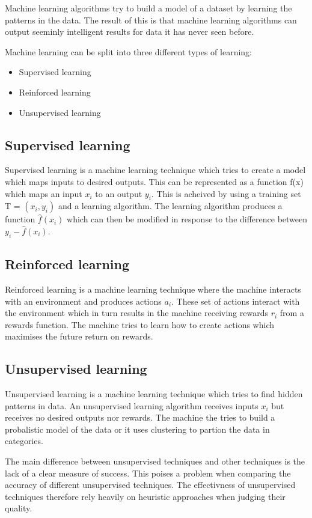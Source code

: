 Machine learning algorithms try to build a model of a dataset by learning the patterns in the data.
The result of this is that machine learning algorithms can output seeminly intelligent results for data it has never seen before.

Machine learning can be split into three different types of learning:
\begin{itemize}
    \item Supervised learning
    \item Reinforced learning
    \item Unsupervised learning
\end{itemize}

\subsection{Supervised learning}
Supervised learning is a machine learning technique which tries to create a model which maps inputs to desired outputs.
This can be represented as a function f(x) which maps an input \(x_i\) to an output \(y_i\).
This is acheived by using a training set T = \((x_i, y_i)\) and a learning algorithm.
The learning algorithm produces a function \(\hat{f}(x_i)\) which can then be modified in response to the difference between \(y_i - \hat{f}(x_i)\).

\subsection{Reinforced learning}
Reinforced learning is a machine learning technique where the machine interacts with an environment and produces actions \(a_i\).
These set of actions interact with the environment which in turn results in the machine receiving rewards \(r_i\) from a rewards function.
The machine tries to learn how to create actions which maximises the future return on rewards.

\subsection{Unsupervised learning}
Unsupervised learning is a machine learning technique which tries to find hidden patterns in data.
An unsupervised learning algorithm receives inputs \(x_i\) but receives no desired outputs nor rewards.
The machine the tries to build a probalistic model of the data or it uses clustering to partion the data in categories.

The main difference between unsupervised techniques and other techniques is the lack of a clear measure of success.
This poises a problem when comparing the accuracy of different unsupervised techniques.
The effectivness of unsupervised techniques therefore rely heavily on heuristic approaches when judging their quality.

